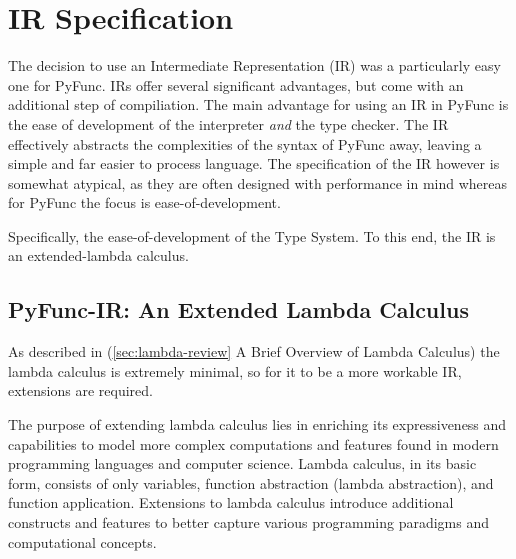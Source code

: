\documentclass{l4proj}
\begin{document}
\clearpage
\section{IR Specification}
The decision to use an Intermediate Representation (IR) was a particularly easy one for PyFunc.
IRs offer several significant advantages, but come with an additional step of compiliation.
The main advantage for using an IR in PyFunc is the ease of development of the interpreter \emph{and} the type checker.
The IR effectively abstracts the complexities of the syntax of PyFunc away, leaving a simple and far easier to process language.
The specification of the IR however is somewhat atypical, as they are often designed with performance in mind whereas for PyFunc the focus is ease-of-development.

Specifically, the ease-of-development of the Type System.
To this end, the IR is an extended-lambda calculus.

\subsection{PyFunc-IR: An Extended Lambda Calculus}
As described in (\ref{sec:lambda-review} A Brief Overview of Lambda Calculus) the lambda calculus is extremely minimal, so for it to be a more workable IR, extensions are required.

The purpose of extending lambda calculus lies in enriching its expressiveness and capabilities to model more complex computations and features found in modern programming languages and computer science.
Lambda calculus, in its basic form, consists of only variables, function abstraction (lambda abstraction), and function application.
Extensions to lambda calculus introduce additional constructs and features to better capture various programming paradigms and computational concepts.
\end{document}
